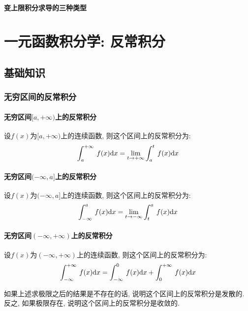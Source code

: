 \subsubsection{变上限积分求导的三种类型}

\chapter{一元函数积分学: 反常积分}
\section{基础知识}
\subsection{无穷区间的反常积分}
\subsubsection{无穷区间$ [a,+\infty) $上的反常积分}
设$ f(x) $为$ [a,+\infty) $上的连续函数, 则这个区间上的反常积分为:
\begin{equation*}
\displaystyle\int_{a}^{+\infty}\hspace{.2em}f(x)\mathrm{d}x=\lim\limits_{t \rightarrow +\infty}\displaystyle\int_{a}^{t}\hspace{.2em}f(x)\mathrm{d}x
\end{equation*}
\subsubsection{无穷区间$ (-\infty,a] $上的反常积分}
设$ f(x) $为$ (-\infty,a] $上的连续函数, 则这个区间上的反常积分为:
\begin{equation*}
\displaystyle\int_{-\infty}^{a}\hspace{.2em}f(x)\mathrm{d}x=\lim\limits_{t \rightarrow -\infty}\displaystyle\int_{t}^{a}\hspace{.2em}f(x)\mathrm{d}x
\end{equation*}
\subsubsection{无穷区间$ (-\infty,+\infty) $上的反常积分}
设$ f(x) $为$ (-\infty,+\infty) $上的连续函数, 则这个区间上的反常积分为:
\begin{equation*}
\displaystyle\int_{-\infty}^{+\infty}\hspace{.2em}f(x)\mathrm{d}x=\displaystyle\int_{-\infty}^{0}\hspace{.2em}f(x)\mathrm{d}x+\displaystyle\int_{0}^{+\infty}\hspace{.2em}f(x)\mathrm{d}x
\end{equation*}
\begin{tcolorbox}
如果上述求极限之后的结果是不存在的话, 说明这个区间上的反常积分是发散的. 反之, 如果极限存在, 说明这个区间上的反常积分是收敛的.
\end{tcolorbox}
